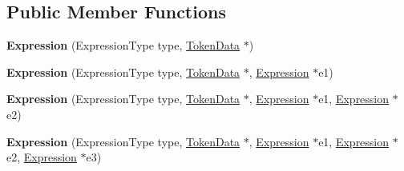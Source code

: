 \subsection*{Public Member Functions}
\begin{DoxyCompactItemize}
\item 
{\bfseries Expression} (Expression\+Type type, \hyperlink{class_object_script_1_1_o_s_1_1_core_1_1_tokenizer_1_1_token_data}{Token\+Data} $\ast$)\hypertarget{struct_object_script_1_1_o_s_1_1_core_1_1_compiler_1_1_expression_ad340bd2d49c2cc488401618cb8cf061e}{}\label{struct_object_script_1_1_o_s_1_1_core_1_1_compiler_1_1_expression_ad340bd2d49c2cc488401618cb8cf061e}

\item 
{\bfseries Expression} (Expression\+Type type, \hyperlink{class_object_script_1_1_o_s_1_1_core_1_1_tokenizer_1_1_token_data}{Token\+Data} $\ast$, \hyperlink{struct_object_script_1_1_o_s_1_1_core_1_1_compiler_1_1_expression}{Expression} $\ast$e1)\hypertarget{struct_object_script_1_1_o_s_1_1_core_1_1_compiler_1_1_expression_aaa7321e6c4c8932f7599c49e6c24d8d2}{}\label{struct_object_script_1_1_o_s_1_1_core_1_1_compiler_1_1_expression_aaa7321e6c4c8932f7599c49e6c24d8d2}

\item 
{\bfseries Expression} (Expression\+Type type, \hyperlink{class_object_script_1_1_o_s_1_1_core_1_1_tokenizer_1_1_token_data}{Token\+Data} $\ast$, \hyperlink{struct_object_script_1_1_o_s_1_1_core_1_1_compiler_1_1_expression}{Expression} $\ast$e1, \hyperlink{struct_object_script_1_1_o_s_1_1_core_1_1_compiler_1_1_expression}{Expression} $\ast$e2)\hypertarget{struct_object_script_1_1_o_s_1_1_core_1_1_compiler_1_1_expression_aa619e080c5d4fcacdd144b02c43ffb84}{}\label{struct_object_script_1_1_o_s_1_1_core_1_1_compiler_1_1_expression_aa619e080c5d4fcacdd144b02c43ffb84}

\item 
{\bfseries Expression} (Expression\+Type type, \hyperlink{class_object_script_1_1_o_s_1_1_core_1_1_tokenizer_1_1_token_data}{Token\+Data} $\ast$, \hyperlink{struct_object_script_1_1_o_s_1_1_core_1_1_compiler_1_1_expression}{Expression} $\ast$e1, \hyperlink{struct_object_script_1_1_o_s_1_1_core_1_1_compiler_1_1_expression}{Expression} $\ast$e2, \hyperlink{struct_object_script_1_1_o_s_1_1_core_1_1_compiler_1_1_expression}{Expression} $\ast$e3)\hypertarget{struct_object_script_1_1_o_s_1_1_core_1_1_compiler_1_1_expression_afd5ddb0ab4d5e3febf5c3283dd66b282}{}\label{struct_object_script_1_1_o_s_1_1_core_1_1_compiler_1_1_expression_afd5ddb0ab4d5e3febf5c3283dd66b282}


\end{DoxyCompactItemize}

